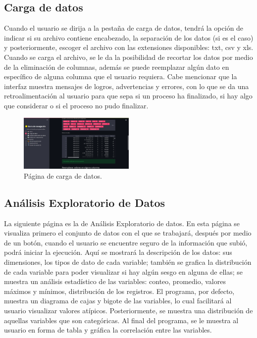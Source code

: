 \documentclass{article}
\begin{document}
\subsection{Carga de datos}
\noindent Cuando el usuario se dirija a la pestaña de carga de datos, tendrá la opción de indicar si su archivo contiene encabezado, la separación de los datos (si es el caso) y
posteriormente, escoger el archivo con las extensiones disponibles: txt, csv y xls. Cuando se carga el archivo, se le da la posibilidad de recortar los datos por medio
de la eliminación de columnas, además se puede reemplazar algún dato en específico de alguna columna que el usuario requiera. Cabe mencionar que la interfaz muestra mensajes
de logros, advertencias y errores, con lo que se da una retroalimentación al usuario para que sepa si un proceso ha finalizado, si hay algo que considerar o si el proceso no pudo finalizar.\\
\begin{figure}[!htb]
	\centering
	\includegraphics[width=0.5\textwidth]{figures/pagina-carga-datos.png}
	\caption{Página de carga de datos.}
	\label{fig:carga-datos}
\end{figure}

\subsection{Análisis Exploratorio de Datos}
\noindent La siguiente página es la de Análisis Exploratorio de datos. En esta página se visualiza primero el conjunto de datos con el que se trabajará, después por medio de un botón,
cuando el usuario se encuentre seguro de la información que subió, podrá iniciar la ejecución. Aquí se mostrará la descripción de los datos: sus dimensiones, los tipos de dato
de cada variable; también se grafica la distribución de cada variable para poder visualizar si hay algún sesgo en alguna de ellas; se muestra un análisis estadístico de las variables:
conteo, promedio, valores máximos y mínimos, distribución de los registros. El programa, por defecto, muestra un diagrama de cajas y bigote de las variables, lo cual facilitará
al usuario visualizar valores atípicos. Posteriormente, se muestra una distribución de aquellas variables que son categóricas. Al final del programa, se le muestra al usuario en forma de tabla
y gráfica la correlación entre las variables.
\end{document}
